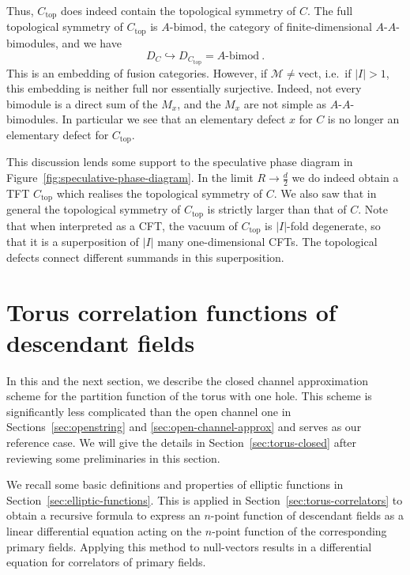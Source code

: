 \documentclass[11pt,a4paper]{article}
\numberwithin{equation}{section}
\newcommand{\MC}{\mathcal{M}} %
\begin{document}
Thus, $C_\mathrm{top}$ does indeed contain the topological symmetry of $C$. The full topological symmetry of $C_\mathrm{top}$ is $A\text{-bimod}$, the category of finite-dimensional $A$-$A$-bimodules, and we have
\begin{equation}
D_C \hookrightarrow D_{C_\mathrm{top}} = A\text{-bimod}~.
\end{equation}
%
This is an embedding of fusion categories. However, if $\MC \neq \mathrm{vect}$, i.e.\ if $|I|>1$, this embedding is neither full nor
essentially surjective. Indeed, not every bimodule is a direct sum of the $M_x$, and the $M_x$ are not simple as $A$-$A$-bimodules. In particular we see that an elementary defect $x$ for $C$ is no longer an elementary defect for $C_\mathrm{top}$.

\medskip

This discussion lends some support to the speculative phase diagram in Figure~\ref{fig:speculative-phase-diagram}. In the limit $R \to \frac d2$ we do indeed obtain a TFT $C_\mathrm{top}$ which realises the topological symmetry of $C$. We also saw that in general the topological symmetry of $C_\mathrm{top}$ is strictly larger than that of $C$. 
Note that when interpreted as a CFT, the vacuum of $C_\mathrm{top}$ is $|I|$-fold degenerate, so that it is a superposition of $|I|$ many one-dimensional CFTs. The topological defects connect different summands in this superposition. 


\section{Torus correlation functions of descendant fields} \label{sec:TorusDescCorr}

In this and the next section, we describe the closed channel approximation scheme for the partition function of the torus with one hole. 
This scheme is significantly less complicated than the open channel one in Sections~\ref{sec:openstring} and \ref{sec:open-channel-approx} and serves as our reference case. We will give the details in Section~\ref{sec:torus-closed} after reviewing some preliminaries in this section.

We recall some basic definitions and properties of elliptic functions in Section~\ref{sec:elliptic-functions}. This is applied in Section~\ref{sec:torus-correlators} to obtain a recursive formula to express an $n$-point function of descendant fields as a linear differential equation acting on the $n$-point function of the corresponding primary fields. Applying this method to null-vectors results in a differential equation for correlators of primary fields.
\end{document}

